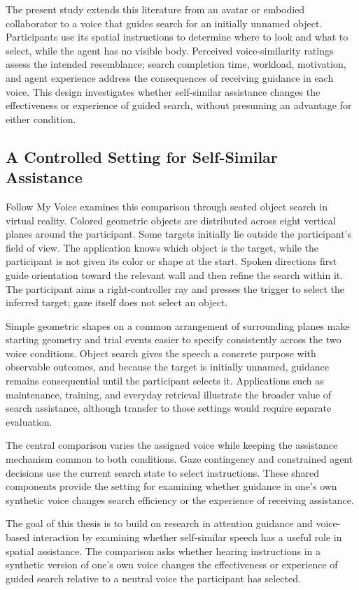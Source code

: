 The present study extends this literature from an avatar or embodied collaborator to a voice that guides search for an initially unnamed object. Participants use its spatial instructions to determine where to look and what to select, while the agent has no visible body. Perceived voice-similarity ratings assess the intended resemblance; search completion time, workload, motivation, and agent experience address the consequences of receiving guidance in each voice. This design investigates whether self-similar assistance changes the effectiveness or experience of guided search, without presuming an advantage for either condition.

\subsection{A Controlled Setting for Self-Similar Assistance}
Follow My Voice examines this comparison through seated object search in virtual reality. Colored geometric objects are distributed across eight vertical planes around the participant. Some targets initially lie outside the participant's field of view. The application knows which object is the target, while the participant is not given its color or shape at the start. Spoken directions first guide orientation toward the relevant wall and then refine the search within it. The participant aims a right-controller ray and presses the trigger to select the inferred target; gaze itself does not select an object.

Simple geometric shapes on a common arrangement of surrounding planes make starting geometry and trial events easier to specify consistently across the two voice conditions. Object search gives the speech a concrete purpose with observable outcomes, and because the target is initially unnamed, guidance remains consequential until the participant selects it. Applications such as maintenance, training, and everyday retrieval illustrate the broader value of search assistance, although transfer to those settings would require separate evaluation.

The central comparison varies the assigned voice while keeping the assistance mechanism common to both conditions. Gaze contingency and constrained agent decisions use the current search state to select instructions. These shared components provide the setting for examining whether guidance in one's own synthetic voice changes search efficiency or the experience of receiving assistance.

The goal of this thesis is to build on research in attention guidance and voice-based interaction by examining whether self-similar speech has a useful role in spatial assistance. The comparison asks whether hearing instructions in a synthetic version of one's own voice changes the effectiveness or experience of guided search relative to a neutral voice the participant has selected.

